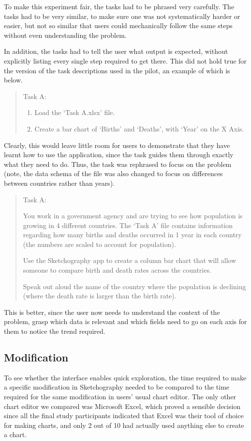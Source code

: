 To make this experiment fair, the tasks had to be phrased very carefully. The tasks had to be very similar, to make sure one was not systematically harder or easier, but not so similar that users could mechanically follow the same steps without even understanding the problem.

In addition, the tasks had to tell the user what output is expected, without explicitly listing every single step required to get there. This did not hold true for the version of the task descriptions used in the pilot, an example of which is below.

\begin{quotation}
Task A:
\begin{enumerate}
\item Load the `Task A.xlsx' file.
\item Create a bar chart of `Births' and `Deaths', with `Year' on the X Axis.
\end{enumerate}
\end{quotation}

Clearly, this would leave little room for users to demonstrate that they have learnt how to use the application, since the task guides them through exactly what they need to do. Thus, the task was rephrased to focus on the problem (note, the data schema of the file was also changed to focus on differences between countries rather than years).

\begin{quotation}
Task A:

You work in a government agency and are trying to see how population is growing in 4 different countries. The ‘Task A’ file contains information regarding how many births and deaths occurred in 1 year in each country (the numbers are scaled to account for population). 

Use the Sketchography app to create a column bar chart that will allow someone to compare birth and death rates across the countries.

Speak out aloud the name of the country where the population is declining (where the death rate is larger than the birth rate).

\end{quotation}

This is better, since the user now needs to understand the context of the problem, grasp which data is relevant and which fields need to go on each axis for them to notice the trend required.

\subsection*{Modification}
To see whether the interface enables quick exploration, the time required to make a specific modification in Sketchography needed to be compared to the time required for the same modification in users' usual chart editor. The only other chart editor we compared was Microsoft Excel, which proved a sensible decision since all the final study participants indicated that Excel was their tool of choice for making charts, and only 2 out of 10 had actually used anything else to create a chart.

